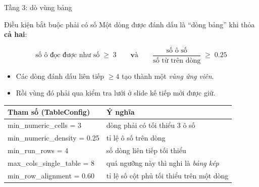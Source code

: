 \documentclass[aspectratio=169,11pt]{beamer}
\newcommand{\src}[1]{{\footnotesize\ttfamily #1}}
\begin{document}
\begin{frame}{Tầng 3: dò vùng bảng}
  \begin{block}{\small Điều kiện bắt buộc phải có số}
    Một dòng được đánh dấu là ``dòng bảng'' khi thỏa \textbf{cả hai}:
  \end{block}
  \[
    \text{số ô đọc được như số} \;\ge\; 3
    \qquad\textbf{và}\qquad
    \frac{\text{số ô số}}{\text{số từ trên dòng}} \;\ge\; 0.25
  \]
  \begin{itemize}\small
    \item Các dòng đánh dấu liên tiếp $\ge 4$ tạo thành một \emph{vùng ứng viên}.
    \item Rồi vùng đó phải qua kiểm tra lưới ở slide kế tiếp mới được giữ.
  \end{itemize}
  \vspace{0.2em}
  \centering
  {\footnotesize
  \begin{tabular}{@{}l l@{}}
    \toprule
    \textbf{Tham số (\src{TableConfig})} & \textbf{Ý nghĩa} \\
    \midrule
    \src{min\_numeric\_cells = 3} & dòng phải có tối thiểu 3 ô số \\
    \src{min\_numeric\_density = 0.25} & tỉ lệ ô số trên dòng \\
    \src{min\_run\_rows = 4} & số dòng liên tiếp tối thiểu \\
    \src{max\_cols\_single\_table = 8} & quá ngưỡng này thì nghi là \emph{bảng kép} \\
    \src{min\_row\_alignment = 0.60} & tỉ lệ số cột phủ tối thiểu trên một dòng \\
    \bottomrule
  \end{tabular}}
\end{frame}
\end{document}
